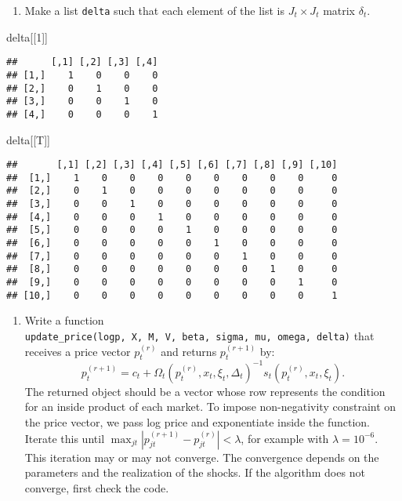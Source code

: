 \documentclass[
]{book}
\newenvironment{Shaded}{\begin{snugshade}}{\end{snugshade}}
\newcommand{\DecValTok}[1]{\textcolor[rgb]{0.00,0.00,0.81}{#1}}
\newcommand{\NormalTok}[1]{#1}
\providecommand{\tightlist}{%
  \setlength{\itemsep}{0pt}\setlength{\parskip}{0pt}}
\begin{document}
\begin{enumerate}
\def\labelenumi{\arabic{enumi}.}
\setcounter{enumi}{5}
\tightlist
\item
  Make a list \texttt{delta} such that each element of the list is \(J_t \times J_t\) matrix \(\delta_t\).
\end{enumerate}

\begin{Shaded}
\begin{Highlighting}[]
\NormalTok{delta[[}\DecValTok{1}\NormalTok{]]}
\end{Highlighting}
\end{Shaded}

\begin{verbatim}
##      [,1] [,2] [,3] [,4]
## [1,]    1    0    0    0
## [2,]    0    1    0    0
## [3,]    0    0    1    0
## [4,]    0    0    0    1
\end{verbatim}

\begin{Shaded}
\begin{Highlighting}[]
\NormalTok{delta[[T]]}
\end{Highlighting}
\end{Shaded}

\begin{verbatim}
##       [,1] [,2] [,3] [,4] [,5] [,6] [,7] [,8] [,9] [,10]
##  [1,]    1    0    0    0    0    0    0    0    0     0
##  [2,]    0    1    0    0    0    0    0    0    0     0
##  [3,]    0    0    1    0    0    0    0    0    0     0
##  [4,]    0    0    0    1    0    0    0    0    0     0
##  [5,]    0    0    0    0    1    0    0    0    0     0
##  [6,]    0    0    0    0    0    1    0    0    0     0
##  [7,]    0    0    0    0    0    0    1    0    0     0
##  [8,]    0    0    0    0    0    0    0    1    0     0
##  [9,]    0    0    0    0    0    0    0    0    1     0
## [10,]    0    0    0    0    0    0    0    0    0     1
\end{verbatim}

\begin{enumerate}
\def\labelenumi{\arabic{enumi}.}
\setcounter{enumi}{6}
\tightlist
\item
  Write a function \texttt{update\_price(logp,\ X,\ M,\ V,\ beta,\ sigma,\ mu,\ omega,\ delta)} that receives a price vector \(p_t^{(r)}\) and returns \(p_t^{(r + 1)}\) by:
  \[
  p_t^{(r + 1)} = c_t + \Omega_t(p_t^{(r)}, x_t, \xi_t, \Delta_t)^{-1} s_t(p_t^{(r)}, x_t, \xi_t).
  \]
  The returned object should be a vector whose row represents the condition for an inside product of each market. To impose non-negativity constraint on the price vector, we pass log price and exponentiate inside the function. Iterate this until \(\max_{jt}|p_{jt}^{(r + 1)} - p_{jt}^{(r)}| < \lambda\), for example with \(\lambda = 10^{-6}\). This iteration may or may not converge. The convergence depends on the parameters and the realization of the shocks. If the algorithm does not converge, first check the code.
\end{enumerate}
\end{document}
